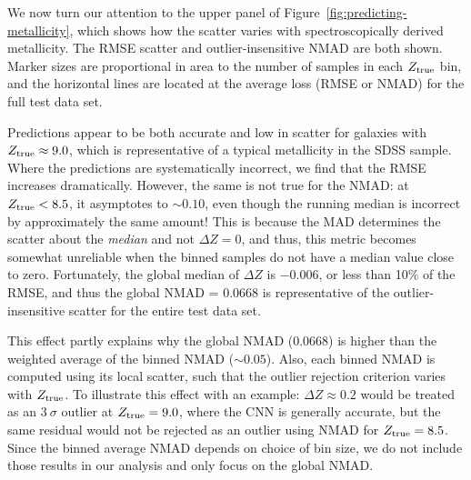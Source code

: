 \documentclass[fleqn,usenatbib]{mnras}
\begin{document}
We now turn our attention to the upper panel of Figure~\ref{fig:predicting-metallicity}, which shows how the scatter varies with spectroscopically derived metallicity.
The RMSE scatter and outlier-insensitive NMAD are both shown.
Marker sizes are proportional in area to the number of samples in each $Z_{\rm true}$ bin, and the horizontal lines are located at the average loss (RMSE or NMAD) for the full test data set.

Predictions appear to be both accurate and low in scatter for galaxies with $Z_{\rm true} \approx 9.0$, which is representative of a typical metallicity in the SDSS sample.
Where the predictions are systematically incorrect, we find that the RMSE increases dramatically.
However, the same is not true for the NMAD: at $Z_{\rm true} < 8.5$, it asymptotes to $\sim 0.10$, even though the running median is incorrect by approximately the same amount!
This is because the MAD determines the scatter about the \textit{median} and not $\Delta Z = 0$, and thus, this metric becomes somewhat unreliable when the binned samples do not have a median value close to zero.
Fortunately, the global median of $\Delta Z$ is $-0.006$, or less than 10\% of the RMSE, and thus the global NMAD = 0.0668 is representative of the outlier-insensitive scatter for the entire test data set.

This effect partly explains why the global NMAD (0.0668) is higher than the weighted average of the binned NMAD ($\sim 0.05$).
Also, each binned NMAD is computed using its local scatter, such that the outlier rejection  criterion varies with $Z_{\rm true}$.
To illustrate this effect with an example: $\Delta Z \approx 0.2$ would be treated as an $3~\sigma$ outlier at $Z_{\rm true} = 9.0$, where the CNN is generally accurate, but the same residual would not be rejected as an outlier using NMAD for $Z_{\rm true} = 8.5$.
Since the binned average NMAD depends on choice of bin size, we do not include those results in our analysis and only focus on the global NMAD.
\end{document}
